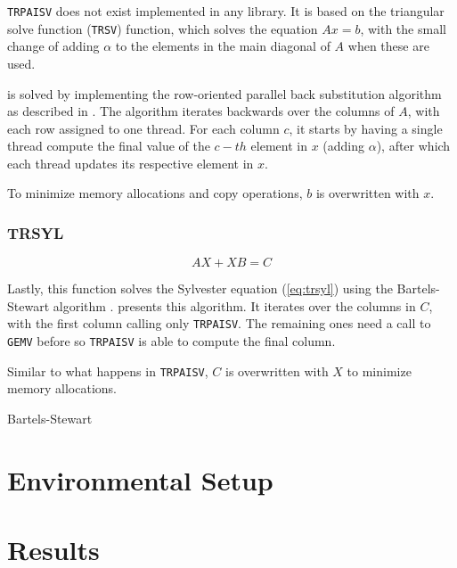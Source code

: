 \documentclass[../thesis]{subfiles}
\begin{document}
		\texttt{TRPAISV} does not exist implemented in any \blas library. It is based on the triangular solve function (\texttt{TRSV}) function, which solves the equation $Ax = b$, with the small change of adding $\alpha$ to the elements in the main diagonal of $A$ when these are used.

		 is solved by implementing the row-oriented parallel back substitution algorithm as described in \cite[293-295]{Quinn:PP:2003}. The algorithm iterates backwards over the columns of $A$, with each row assigned to one thread. For each column $c$, it starts by having a single thread compute the final value of the $c-th$ element in $x$ (adding $\alpha$), after which each thread updates its respective element in $x$.

		To minimize memory allocations and copy operations, $b$ is overwritten with $x$.

		\subsubsection{TRSYL}
		\begin{equation}
			AX + XB = C
			\label{eq:trsyl}
		\end{equation}

		Lastly, this function solves the Sylvester equation (\cref{eq:trsyl}) using the Bartels-Stewart algorithm \cite[367-368]{Golub:Loan:MC:1996}.  presents this algorithm. It iterates over the columns in $C$, with the first column calling only \texttt{TRPAISV}. The remaining ones need a call to \texttt{GEMV} before so \texttt{TRPAISV} is able to compute the final column.

		Similar to what happens in \texttt{TRPAISV}, $C$ is overwritten with $X$ to minimize memory allocations.

		\begin{algorithm}[htp]
			\caption{Bartels-Stewart}
			\label{alg:bartel_stewart}
			\DontPrintSemicolon



		\end{algorithm}

	\section{Environmental Setup}
	\section{Results}

	
\end{document}
